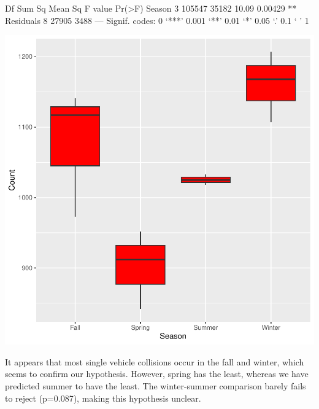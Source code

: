 \documentclass[11pt, a4paper]{article}
\begin{document}
\begin{Schunk}
\begin{Soutput}
            Df Sum Sq Mean Sq F value  Pr(>F)   
Season       3 105547   35182   10.09 0.00429 **
Residuals    8  27905    3488                   
---
Signif. codes:  0 ‘***’ 0.001 ‘**’ 0.01 ‘*’ 0.05 ‘.’ 0.1 ‘ ’ 1
\end{Soutput}
\end{Schunk}
\includegraphics{regression-050}


It appears that most single vehicle collisions occur in the fall and winter, which seems to confirm our hypothesis. However, spring has the least, whereas we have predicted summer to have the least. The winter-summer comparison barely fails to reject (p=0.087), making this hypothesis unclear. 
\end{document}
